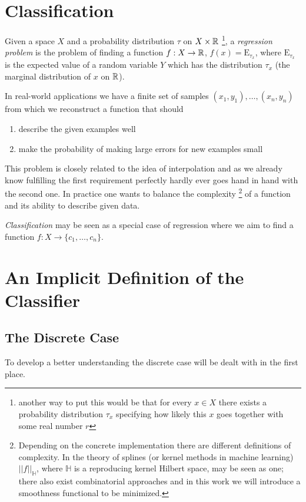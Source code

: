\section{Classification}
Given a space $X$ and a probability distribution $\tau$ on $X\times \mathbb{R}$
\footnote{another way to put this would be that for every $x\in X$ there exists a probability distribution $\tau _x$ specifying how likely this $x$ goes together with some real number $r$},
a \textit{regression problem} is the problem of finding a function $f:X\rightarrow\mathbb{R}$, $f(x)=\mathrm{E}_{\tau _x}$, where  $\mathrm{E}_{\tau _x}$ is the expected value of a random variable $Y$ which has the distribution $\tau _x$ (the marginal distribution of $x$ on $\mathbb{R}$).

In real-world applications we have a finite set of samples $(x_1,y_1), \dots, (x_n,y_n)$ from which we reconstruct a function that should
\begin{enumerate}
    \item describe the given examples well
    \item make the probability of making large errors for new examples small
\end{enumerate}
This problem is closely related to the idea of interpolation and as we already know fulfilling the first requirement perfectly hardly ever goes hand in hand with the second one. In practice one wants to balance the complexity \footnote{Depending on the concrete implementation there are different definitions of complexity. In the theory of splines (or kernel methods in machine learning) $||f||_\mathbb{H}$, where $\mathbb{H}$ is a reproducing kernel Hilbert space, may be seen as one; there also exist combinatorial approaches and in this work we will introduce a smoothness functional to be minimized.} of a function and its ability to describe given data.

\textit{Classification} may be seen as a special case of regression where we aim to find a function $f:X\rightarrow \{c_1,\dots,c_n\}$.

\section{An Implicit Definition of the Classifier}
\subsection{The Discrete Case}
To develop a better understanding the discrete case will be dealt with in the first place.

